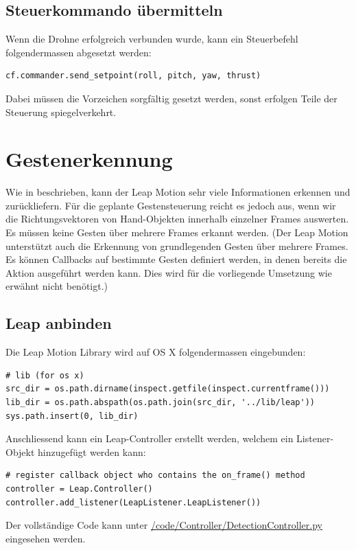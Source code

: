 \subsection{Steuerkommando übermitteln}
Wenn die Drohne erfolgreich verbunden wurde, kann ein Steuerbefehl folgendermassen abgesetzt werden:

\begin{lstlisting}[style=lstStyleCpp]
cf.commander.send_setpoint(roll, pitch, yaw, thrust)
\end{lstlisting}

Dabei müssen die Vorzeichen sorgfältig gesetzt werden, sonst erfolgen Teile der Steuerung spiegelverkehrt.


\section{Gestenerkennung}
Wie in  beschrieben, kann der Leap Motion sehr viele Informationen erkennen und zurückliefern.
Für die geplante Gestensteuerung reicht es jedoch aus, wenn wir die Richtungsvektoren von Hand-Objekten innerhalb einzelner Frames auswerten.
Es müssen keine Gesten über mehrere Frames erkannt werden. (Der Leap Motion unterstützt auch die Erkennung von grundlegenden Gesten über mehrere Frames. Es können Callbacks auf bestimmte Gesten definiert werden, in denen bereits die Aktion ausgeführt werden kann. Dies wird für die vorliegende Umsetzung wie erwähnt nicht benötigt.)

\subsection{Leap anbinden}
Die Leap Motion Library wird auf OS X folgendermassen eingebunden:
\begin{lstlisting}[style=lstStyleCpp]
# lib (for os x)
src_dir = os.path.dirname(inspect.getfile(inspect.currentframe()))
lib_dir = os.path.abspath(os.path.join(src_dir, '../lib/leap'))
sys.path.insert(0, lib_dir)
\end{lstlisting}

Anschliessend kann ein Leap-Controller erstellt werden, welchem ein Listener-Objekt hinzugefügt werden kann:
\begin{lstlisting}[style=lstStyleCpp]
# register callback object who contains the on_frame() method
controller = Leap.Controller()
controller.add_listener(LeapListener.LeapListener())
\end{lstlisting}

Der vollständige Code kann unter \href{https://github.com/MrJack91/droneGestures/blob/master/code/Controller/DetectionController.py}{/code/Controller/DetectionController.py} eingesehen werden.

